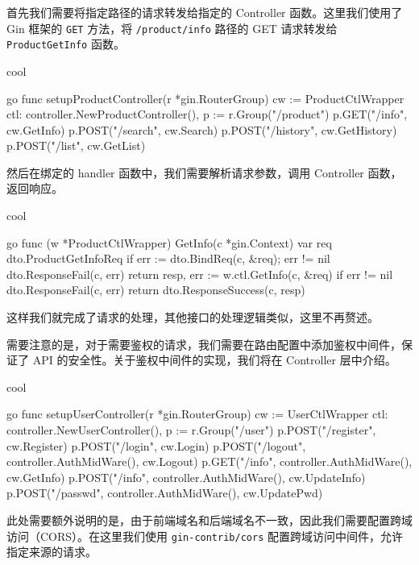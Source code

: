 首先我们需要将指定路径的请求转发给指定的 Controller 函数。这里我们使用了 Gin 框架的 \texttt{GET} 方法，将 \texttt{/product/info} 路径的 GET 请求转发给 \texttt{ProductGetInfo} 函数。

\begin{codebox}{}{cool}
\begin{amzcode}{go}
func setupProductController(r *gin.RouterGroup) {
	cw := ProductCtlWrapper{
		ctl: controller.NewProductController(),
	}
	p := r.Group("/product")
	p.GET("/info", cw.GetInfo)
	p.POST("/search", cw.Search)
	p.POST("/history", cw.GetHistory)
	p.POST("/list", cw.GetList)
}
\end{amzcode}
\end{codebox}

然后在绑定的 handler 函数中，我们需要解析请求参数，调用 Controller 函数，返回响应。

\begin{codebox}{}{cool}
\begin{amzcode}{go}
func (w *ProductCtlWrapper) GetInfo(c *gin.Context) {
	var req dto.ProductGetInfoReq
	if err := dto.BindReq(c, &req); err != nil {
		dto.ResponseFail(c, err)
		return
	}
	resp, err := w.ctl.GetInfo(c, &req)
	if err != nil {
		dto.ResponseFail(c, err)
		return
	}
	dto.ResponseSuccess(c, resp)
}
\end{amzcode}
\end{codebox}

这样我们就完成了请求的处理，其他接口的处理逻辑类似，这里不再赘述。

需要注意的是，对于需要鉴权的请求，我们需要在路由配置中添加鉴权中间件，保证了 API 的安全性。关于鉴权中间件的实现，我们将在 Controller 层中介绍。

\begin{codebox}{}{cool}
\begin{amzcode}{go}
func setupUserController(r *gin.RouterGroup) {
	cw := UserCtlWrapper{
		ctl: controller.NewUserController(),
	}
	p := r.Group("/user")
	p.POST("/register", cw.Register)
	p.POST("/login", cw.Login)
	p.POST("/logout", controller.AuthMidWare(), cw.Logout)
	p.GET("/info", controller.AuthMidWare(), cw.GetInfo)
	p.POST("/info", controller.AuthMidWare(), cw.UpdateInfo)
	p.POST("/passwd", controller.AuthMidWare(), cw.UpdatePwd)
}
\end{amzcode}
\end{codebox}

此处需要额外说明的是，由于前端域名和后端域名不一致，因此我们需要配置跨域访问（CORS）。在这里我们使用 \texttt{gin-contrib/cors} 配置跨域访问中间件，允许指定来源的请求。


